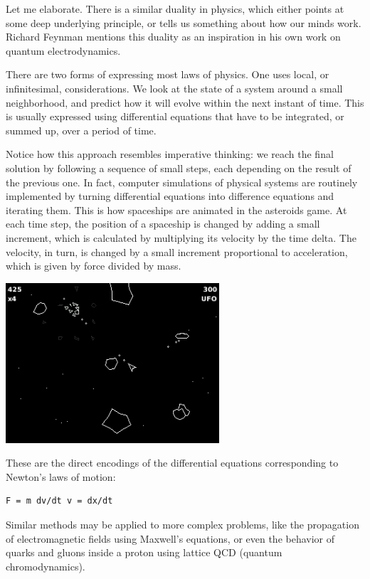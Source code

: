 Let me elaborate. There is a similar duality in physics, which either
points at some deep underlying principle, or tells us something about
how our minds work. Richard Feynman mentions this duality as an
inspiration in his own work on quantum electrodynamics.

There are two forms of expressing most laws of physics. One uses local,
or infinitesimal, considerations. We look at the state of a system
around a small neighborhood, and predict how it will evolve within the
next instant of time. This is usually expressed using differential
equations that have to be integrated, or summed up, over a period of
time.

Notice how this approach resembles imperative thinking: we reach the
final solution by following a sequence of small steps, each depending on
the result of the previous one. In fact, computer simulations of
physical systems are routinely implemented by turning differential
equations into difference equations and iterating them. This is how
spaceships are animated in the asteroids game. At each time step, the
position of a spaceship is changed by adding a small increment, which is
calculated by multiplying its velocity by the time delta. The velocity,
in turn, is changed by a small increment proportional to acceleration,
which is given by force divided by mass.

\includegraphics[width=3.12500in]{images/asteroids.png}

These are the direct encodings of the differential equations
corresponding to Newton's laws of motion:

\begin{verbatim}
F = m dv/dt v = dx/dt
\end{verbatim}

Similar methods may be applied to more complex problems, like the
propagation of electromagnetic fields using Maxwell's equations, or even
the behavior of quarks and gluons inside a proton using lattice QCD
(quantum chromodynamics).

